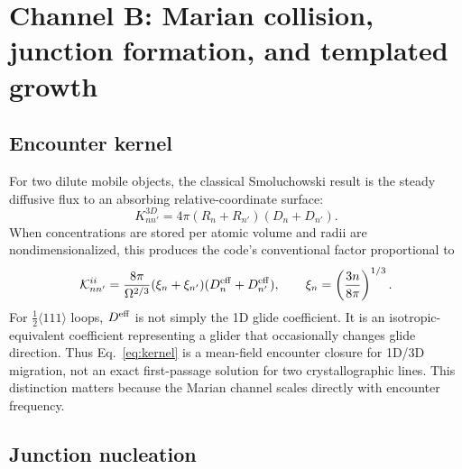 \documentclass[11pt,a4paper]{article}
\newcommand{\hkl}[1]{\langle #1\rangle}
\newcommand{\half}{\tfrac12}
\newcommand{\K}{\mathcal K}
\begin{document}
\section{Channel B: Marian collision, junction formation, and templated growth}

\subsection{Encounter kernel}

For two dilute mobile objects, the classical Smoluchowski result is the steady diffusive flux to an absorbing relative-coordinate surface:
\begin{equation}
 K_{nn'}^{3D}=4\pi(R_n+R_{n'})(D_n+D_{n'}).                              \label{eq:smol}
\end{equation}
When concentrations are stored per atomic volume and radii are nondimensionalized, this produces the code's conventional factor proportional to
\begin{equation}
 \K_{nn'}^{ii}=\frac{8\pi}{\Omega^{2/3}}
 (\xi_n+\xi_{n'})(D_n^{\rm eff}+D_{n'}^{\rm eff}),
 \qquad \xi_n=\left(\frac{3n}{8\pi}\right)^{1/3}.                     \label{eq:kernel}
\end{equation}
For $\half\hkl{111}$ loops, $D^{\rm eff}$ is not simply the 1D glide coefficient.  It is an isotropic-equivalent coefficient representing a glider that occasionally changes glide direction.  Thus Eq.~\eqref{eq:kernel} is a mean-field encounter closure for 1D/3D migration, not an exact first-passage solution for two crystallographic lines.  This distinction matters because the Marian channel scales directly with encounter frequency.

\subsection{Junction nucleation}
\end{document}
